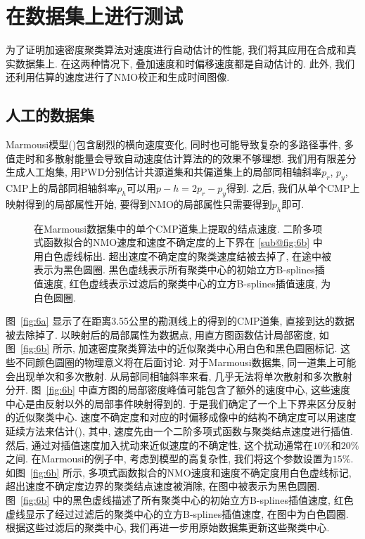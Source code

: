 \section{在数据集上进行测试}
为了证明加速密度聚类算法对速度进行自动估计的性能, 我们将其应用在合成和真实数据集上. 在这两种情况下, 叠加速度和时偏移速度都是自动估计的. 此外, 我们还利用估算的速度进行了NMO校正和生成时间图像. 
\subsection{人工的数据集}
Marmousi模型(\cite{Versteeg1994})包含剧烈的横向速度变化, 同时也可能导致复杂的多路径事件, 多值走时和多散射能量会导致自动速度估计算法的的效果不够理想. 我们用有限差分生成人工炮集, 用PWD分别估计共源道集和共偏道集上的局部同相轴斜率$p_r$, $p_y$, CMP上的局部同相轴斜率$p_h$可以用$p-h = 2p_r - p_y$得到. 之后, 我们从单个CMP上映射得到的局部属性开始, 要得到NMO的局部属性只需要得到$p_h$即可. 
\begin{figure}[htb]
    \centering
    \caption{在Marmousi数据集中的单个CMP道集上提取的结点速度. 二阶多项式函数拟合的NMO速度和速度不确定度的上下界在 \ref{sub@fig:6b} 中用白色虚线标出. 超出速度不确定度的聚类速度结被去掉了, 在途中被表示为黑色圆圈. 黑色虚线表示所有聚类中心的初始立方B-splines插值速度, 红色虚线表示过滤后的聚类中心的立方B-splines插值速度, 为白色圆圈. \label{fig:6}}
\end{figure}
图~\ref{fig:6a} 显示了在距离3.55公里的勘测线上的得到的CMP道集, 直接到达的数据被去除掉了. 以映射后的局部属性为数据点, 用直方图函数估计局部密度, 如图~\ref{fig:6b} 所示, 加速密度聚类算法中的近似聚类中心用白色和黑色圆圈标记. 这些不同颜色圆圈的物理意义将在后面讨论. 对于Marmousi数据集, 同一道集上可能会出现单次和多次散射. 从局部同相轴斜率来看, 几乎无法将单次散射和多次散射分开. 图~\ref{fig:6b} 中直方图的局部密度峰值可能包含了额外的速度中心, 这些速度中心是由反射以外的局部事件映射得到的. 于是我们确定了一个上下界来区分反射的近似聚类中心. 速度不确定度和对应的时偏移成像中的结构不确定度可以用速度延续方法来估计(\cite{Fomel2014}), 其中, 速度先由一个二阶多项式函数与聚类结点速度进行插值. 然后, 通过对插值速度加入扰动来近似速度的不确定性, 这个扰动通常在$10\%$和$20\%$之间. 在Marmousi的例子中, 考虑到模型的高复杂性, 我们将这个参数设置为$15\%$. 如图~\ref{fig:6b} 所示, 多项式函数拟合的NMO速度和速度不确定度用白色虚线标记, 超出速度不确定度边界的聚类结点速度被消除, 在图中被表示为黑色圆圈. 图~\ref{fig:6b} 中的黑色虚线描述了所有聚类中心的初始立方B-splines插值速度, 红色虚线显示了经过过滤后的聚类中心的立方B-splines插值速度, 在图中为白色圆圈. 根据这些过滤后的聚类中心, 我们再进一步用原始数据集更新这些聚类中心. 

